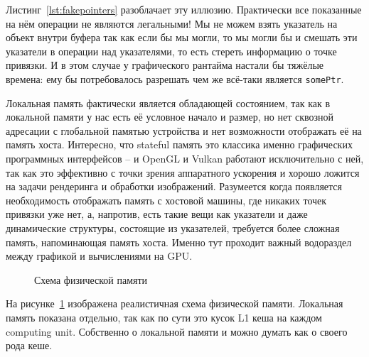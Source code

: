 Листинг~\cref{lst:fakepointers} разоблачает эту иллюзию. Практически все показанные на нём операции не являются легальными! Мы не можем взять указатель на объект внутри буфера так как если бы мы могли, то мы могли бы и смешать эти указатели в операции над указателями, то есть стереть информацию о точке привязки. И в этом случае у графического рантайма настали бы тяжёлые времена: ему бы потребовалось разрешать чем же всё-таки является \lstinline!somePtr!.

Локальная память фактически является обладающей состоянием, так как в локальной памяти у нас есть её условное начало и размер, но нет сквозной адресации с глобальной памятью устройства и нет возможности отображать её на память хоста. Интересно, что stateful память это классика именно графических программных интерфейсов -- и OpenGL \cite{kessenich2016opengl} и Vulkan \cite{sellers2016vulkan} работают исключительно с ней, так как это эффективно с точки зрения аппаратного ускорения и хорошо ложится на задачи рендеринга и обработки изображений. Разумеется когда появляется необходимость отображать память с хостовой машины, где никаких точек привязки уже нет, а, напротив, есть такие вещи как указатели и даже динамические структуры, состоящие из указателей, требуется более сложная память, напоминающая память хоста. Именно тут проходит важный водораздел между графикой и вычислениями на GPU.

\begin{figure}[ht]
  \caption{Схема физической памяти}\label{fig:memory-scheme}
\end{figure}

На рисунке~\ref{fig:memory-scheme} изображена реалистичная схема физической памяти. Локальная память показана отдельно, так как по сути это кусок L1 кеша на каждом computing unit. Собственно о локальной памяти и можно думать как о своего рода кеше.


